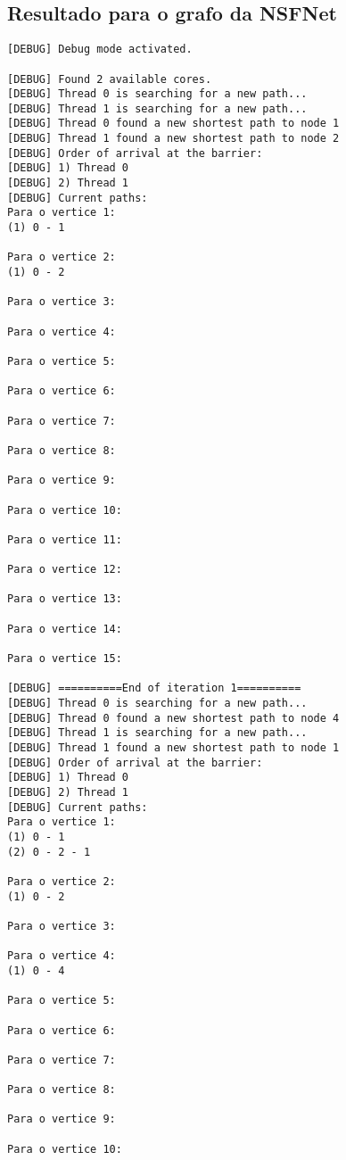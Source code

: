 \documentclass[a4paper,11pt]{article}
\begin{document}
  \subsection{Resultado para o grafo da NSFNet}

\begin{verbatim}
[DEBUG] Debug mode activated.

[DEBUG] Found 2 available cores.
[DEBUG] Thread 0 is searching for a new path...
[DEBUG] Thread 1 is searching for a new path...
[DEBUG] Thread 0 found a new shortest path to node 1
[DEBUG] Thread 1 found a new shortest path to node 2
[DEBUG] Order of arrival at the barrier:
[DEBUG] 1) Thread 0
[DEBUG] 2) Thread 1
[DEBUG] Current paths:
Para o vertice 1:
(1) 0 - 1

Para o vertice 2:
(1) 0 - 2

Para o vertice 3:

Para o vertice 4:

Para o vertice 5:

Para o vertice 6:

Para o vertice 7:

Para o vertice 8:

Para o vertice 9:

Para o vertice 10:

Para o vertice 11:

Para o vertice 12:

Para o vertice 13:

Para o vertice 14:

Para o vertice 15:

[DEBUG] ==========End of iteration 1==========
[DEBUG] Thread 0 is searching for a new path...
[DEBUG] Thread 0 found a new shortest path to node 4
[DEBUG] Thread 1 is searching for a new path...
[DEBUG] Thread 1 found a new shortest path to node 1
[DEBUG] Order of arrival at the barrier:
[DEBUG] 1) Thread 0
[DEBUG] 2) Thread 1
[DEBUG] Current paths:
Para o vertice 1:
(1) 0 - 1
(2) 0 - 2 - 1

Para o vertice 2:
(1) 0 - 2

Para o vertice 3:

Para o vertice 4:
(1) 0 - 4

Para o vertice 5:

Para o vertice 6:

Para o vertice 7:

Para o vertice 8:

Para o vertice 9:

Para o vertice 10:


\end{verbatim}
\end{document}
